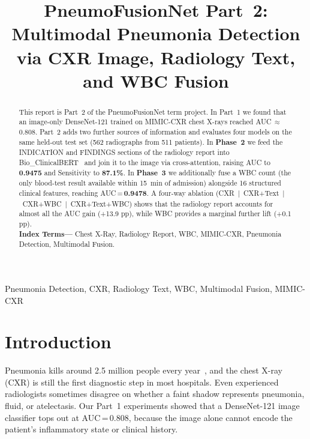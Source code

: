 \documentclass{article}
\title{PneumoFusionNet Part~2: Multimodal Pneumonia Detection\\
via CXR Image, Radiology Text, and WBC Fusion}
\begin{document}
\ninept
\maketitle

\begin{abstract}
This report is Part~2 of the PneumoFusionNet term project.
In Part~1 we found that an image-only DenseNet-121 trained on MIMIC-CXR
chest X-rays reached AUC\,$\approx$\,0.808.
Part~2 adds two further sources of information and evaluates four models
on the same held-out test set (562 radiographs from 511 patients).
In \textbf{Phase~2} we feed the INDICATION and FINDINGS sections of the
radiology report into Bio\_ClinicalBERT~\cite{alsentzer2019bert} and join
it to the image via cross-attention, raising AUC to \textbf{0.9475} and
Sensitivity to \textbf{87.1\%}.
In \textbf{Phase~3} we additionally fuse a WBC count
(the only blood-test result available within 15~min of admission) alongside
16 structured clinical features, reaching AUC\,=\,\textbf{0.9478}.
A four-way ablation (CXR~$|$~CXR+Text~$|$~CXR+WBC~$|$~CXR+Text+WBC)
shows that the radiology report accounts for almost all the AUC gain (+13.9 pp),
while WBC provides a marginal further lift (+0.1 pp).\\
\textbf{Index Terms---} Chest X-Ray, Radiology Report, WBC, MIMIC-CXR,
Pneumonia Detection, Multimodal Fusion.
\end{abstract}

\begin{keywords}
Pneumonia Detection, CXR, Radiology Text, WBC, Multimodal Fusion, MIMIC-CXR
\end{keywords}

\section{Introduction}

Pneumonia kills around 2.5 million people every year~\cite{who2023}, and the
chest X-ray (CXR) is still the first diagnostic step in most hospitals.
Even experienced radiologists sometimes disagree on whether a faint shadow
represents pneumonia, fluid, or atelectasis.
Our Part~1 experiments showed that a DenseNet-121 image classifier tops out
at AUC\,=\,0.808, because the image alone cannot encode the patient's
inflammatory state or clinical history.
\end{document}
